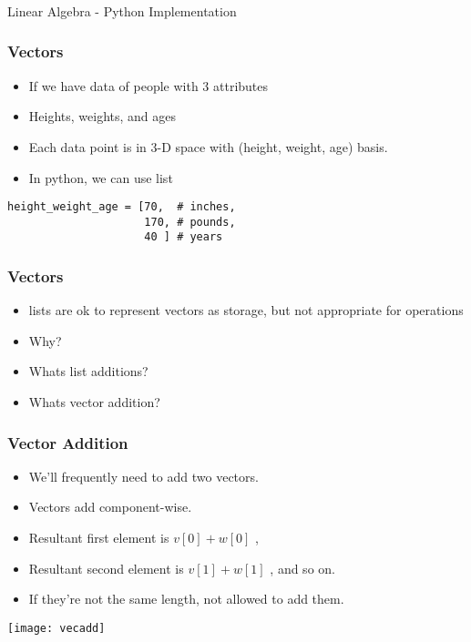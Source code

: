 \begin{frame}[fragile]\frametitle{}
\begin{center}
{\Large Linear Algebra - Python Implementation}
\end{center}
\end{frame}

\begin{frame}[fragile]\frametitle{Vectors}
\begin{itemize}
\item If we have data of people with 3 attributes
\item  Heights, weights, and ages
\item Each data point is in 3-D space with (height,  weight,  age) basis.
\item In python, we can use list
\end{itemize}
\begin{lstlisting}
height_weight_age = [70,  # inches,
                     170, # pounds,
                     40 ] # years
\end{lstlisting}
\end{frame}

\begin{frame}[fragile]\frametitle{Vectors}
\begin{itemize}
\item lists are ok to represent vectors as storage, but not appropriate for operations
\item Why?
\item Whats list additions?
\item Whats vector addition?
\end{itemize}
\end{frame}

\begin{frame}[fragile]\frametitle{Vector Addition}
\begin{itemize}
\item We'll frequently need to add two vectors. 
\item Vectors add component-wise.
\item Resultant first element is  $v[0] + w[0]$ , 
\item Resultant second element is  $v[1] + w[1]$ , and so on. 
\item If they're not the same length,  not allowed to add them.
\end{itemize}
\begin{center}
\texttt{[image: vecadd]}
\end{center}
\end{frame}

